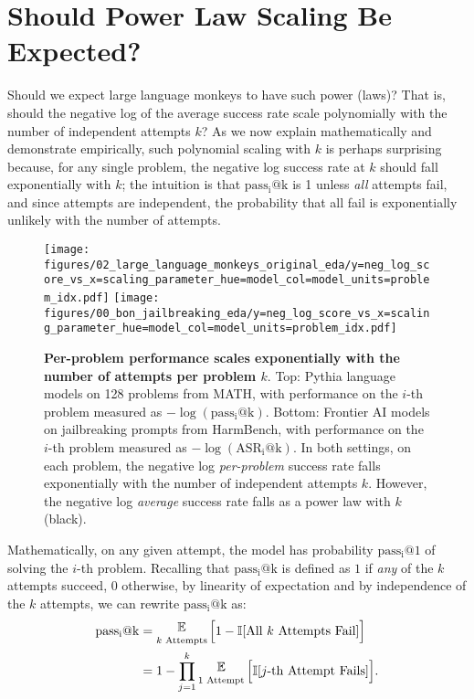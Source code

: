 

\section{Should Power Law Scaling Be Expected?}
\label{sec:should_power_laws_be_expected}

Should we expect large language monkeys to have such power  (laws)? That is, should the negative log of the average success rate scale polynomially with the number of independent attempts $k$? As we now explain mathematically and demonstrate empirically, such polynomial scaling with $k$ is perhaps surprising because, for any single problem, the negative log success rate at $k$ should fall exponentially with $k$; the intuition is that $\operatorname{pass_i@k}$ is 1 unless \textit{all} attempts fail, and since attempts are independent, the probability that all fail is exponentially unlikely with the number of attempts.


\begin{figure*}[t!]
    \centering
    \texttt{[image: figures/02\_large\_language\_monkeys\_original\_eda/y=neg\_log\_score\_vs\_x=scaling\_parameter\_hue=model\_col=model\_units=problem\_idx.pdf]}
    \texttt{[image: figures/00\_bon\_jailbreaking\_eda/y=neg\_log\_score\_vs\_x=scaling\_parameter\_hue=model\_col=model\_units=problem\_idx.pdf]}
    \caption{\textbf{Per-problem performance scales exponentially with the number of attempts per problem $k$}.     
    Top: Pythia language models on 128 problems from MATH, with performance on the $i$-th problem measured as $-\log(\operatorname{pass_i@k})$. Bottom: Frontier AI models on jailbreaking prompts from HarmBench, with performance on the $i$-th problem measured as $-\log(\operatorname{ASR_i@k})$. In both settings, on each problem, the negative log \textit{per-problem} success rate falls exponentially with the number of independent attempts $k$. However, the negative log \textit{average} success rate falls as a power law with $k$ (black).}
    \label{fig:multiple_attempts_scaling_per_datum}
\end{figure*}


Mathematically, on any given attempt, the model has probability $\operatorname{pass_i@1}$ of solving the $i$-th problem.
Recalling that $\operatorname{pass_i@k}$ is defined as $1$ if \textit{any} of the $k$ attempts succeed, 0 otherwise, by linearity of expectation and by independence of the $k$ attempts, we can rewrite $\operatorname{pass_i@k}$ as:
%
\begin{align}
    \operatorname{pass_i@k} &= \mathop{\raisebox{3pt}{$\mathbb{E}$}}_{\substack{k \text{ Attempts}}}\Big[1 - \mathbb{I}[\text{All $k$ Attempts Fail}] \Big]\\
    &= 1 - \prod_{j=1}^k \mathop{\raisebox{3pt}{$\mathbb{E}$}}_{\substack{1 \text{ Attempt}}}\Big[ \mathbb{I}[\text{$j$-th Attempt Fails}] \Big].
\end{align}

